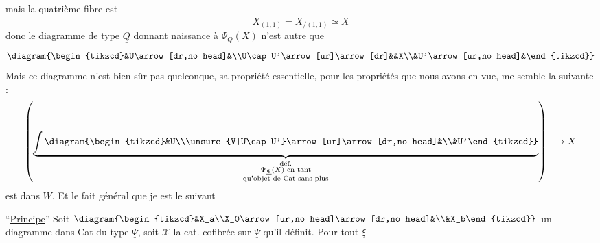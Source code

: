 mais la quatrième fibre est
\[\overline X_{(1,1)}=X_{/(1,1)}\simeq X\]
donc le diagramme  de type $\underline Q$ donnant naissance à $\Psi_{\underline Q}(X)$ n'est autre que
\[\diagram{\begin{tikzcd}&U\arrow[dr,no head]&\\U\cap U'\arrow[ur]\arrow[dr]&&X\\&U'\arrow[ur,no head]&\end{tikzcd}}\]
Mais ce diagramme  n'est bien sûr pas quelconque, sa propriété essentielle, pour les propriétés que nous avons en vue, me semble la suivante :
\[\left(\underbrace{\int\diagram{\begin{tikzcd}&U\\\unsure{V|U\cap U'}\arrow[ur]\arrow[dr,no head]&\\&U'\end{tikzcd}}}_{\substack{\text{déf.}\\\Psi_{\underline\Psi}(X)\text{ en tant}\\\text{qu'objet de Cat sans plus}}}\right)\longrightarrow X\]
est dans $W$. Et le fait général que je  est le suivant

``\uline{Principe}''  Soit $\diagram{\begin{tikzcd}&X_a\\X_0\arrow[ur,no head]\arrow[dr,no head]&\\&X_b\end{tikzcd}}$ un diagramme dans Cat du type $\underline\Psi$, soit $\mathcal X$ la cat. cofibrée sur $\underline\Psi$ qu'il définit. Pour tout $\xi$

